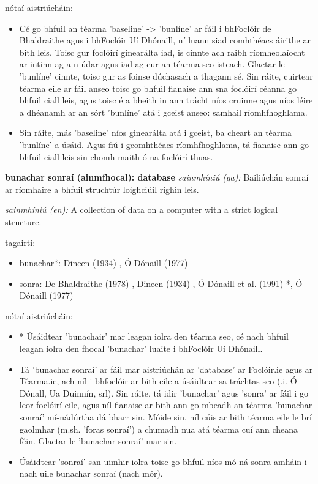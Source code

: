 \documentclass{article}
\begin{document}
nótaí aistriúcháin:
\begin{itemize}
	\item Cé go bhfuil an téarma 'baseline' -> 'bunlíne' ar fáil i bhFoclóir de Bhaldraithe agus i bhFoclóir Uí Dhónaill, ní luann siad comhthéacs áirithe ar bith leis. Toisc gur foclóirí ginearálta iad, is cinnte ach raibh ríomheolaíocht ar intinn ag a n-údar agus iad ag cur an téarma seo isteach. Glactar le 'bunlíne' cinnte, toisc gur as foinse dúchasach a thagann sé. Sin ráite, cuirtear téarma eile ar fáil anseo toisc go bhfuil fianaise ann sna foclóirí céanna go bhfuil ciall leis, agus toisc é a bheith in ann trácht níos cruinne agus níos léire a dhéanamh ar an sórt 'bunlíne' atá i gceist anseo: samhail ríomhfhoghlama.
	\item Sin ráite, más 'baseline' níos ginearálta atá i gceist, ba cheart an téarma 'bunlíne' a úsáid. Agus fiú i gcomhthéacs ríomhfhoghlama, tá fianaise ann go bhfuil ciall leis sin chomh maith ó na foclóirí thuas.
\end{itemize}


\textbf{bunachar sonraí (ainmfhocal): database}
\textit{sainmhíniú (ga):} Bailiúchán sonraí ar ríomhaire a bhfuil struchtúr loighciúil righin leis.

\textit{sainmhíniú (en):} A collection of data on a computer with a strict logical structure.

tagairtí:
\begin{itemize}
	\item bunachar*: Dineen (1934) \cite{dineen}, Ó Dónaill (1977) \cite{odonaill}
	\item sonra: De Bhaldraithe (1978) \cite{de-bhaldraithe}, Dineen (1934) \cite{dineen}, Ó Dónaill et al. (1991) \cite{focloir-beag}*, Ó Dónaill (1977) \cite{odonaill}
\end{itemize}

nótaí aistriúcháin:
\begin{itemize}
	\item * Úsáidtear 'bunachair' mar leagan iolra den téarma seo, cé nach bhfuil leagan iolra den fhocal 'bunachar' luaite i bhFoclóir Uí Dhónaill.
	\item Tá 'bunachar sonraí' ar fáil mar aistriúchán ar 'database' ar Foclóir.ie agus ar Téarma.ie, ach níl i bhfoclóir ar bith eile a úsáidtear sa tráchtas seo (.i. Ó Dónall, Ua Duinnín, srl). Sin ráite, tá idir 'bunachar' agus 'sonra' ar fáil i go leor foclóirí eile, agus níl fianaise ar bith ann go mbeadh an téarma 'bunachar sonraí' mí-nádúrtha dá bharr sin. Móide sin, níl cúis ar bith téarma eile le brí gaolmhar (m.sh. 'foras sonraí') a chumadh nua atá téarma cuí ann cheana féin. Glactar le 'bunachar sonraí' mar sin.
	\item Úsáidtear 'sonraí' san uimhir iolra toisc go bhfuil níos mó ná sonra amháin i nach uile bunachar sonraí (nach mór).
\end{itemize}
\end{document}
